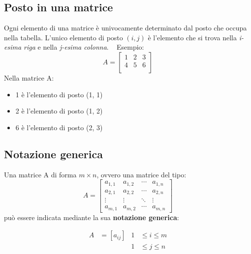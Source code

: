 \documentclass[12pt,oneside]{book}
\begin{document}
\subsection{Posto in una matrice}
Ogni elemento di una matrice è univocamente determinato dal posto che occupa nella tabella.
L'unico elemento di posto $(i,j)$ è l'elemento che si trova nella \emph{i-esima riga} e nella
\emph{j-esima colonna}. \newline
~\newline
Esempio:
\begin{equation*}
    A =
    \begin{bmatrix}
        1 & 2 & 3 \\
        4 & 5 & 6 \\
    \end{bmatrix}
\end{equation*}
Nella matrice A:
\begin{itemize}
    \item 1 è l'elemento di posto (1, 1)
    \item 2 è l'elemento di posto (1, 2)
    \item 6 è l'elemento di posto (2, 3)
\end{itemize}

\subsection{Notazione generica}
Una matrice A di forma $m \times n$, ovvero una matrice del tipo:
\begin{equation*}
    A =
    \begin{bmatrix}
        a_{1,1} & a_{1,2} & \cdots & a_{1,n} \\
        a_{2,1} & a_{2,2} & \cdots & a_{2,n} \\
        \vdots  & \vdots  & \ddots & \vdots  \\
        a_{m,1} & a_{m,2} & \cdots & a_{m,n}
    \end{bmatrix}
\end{equation*}
può essere indicata mediante la sua \textbf{notazione generica}:

\begin{align*}
    A & =[a_{ij}] & 1 & \le i \le m \\
      &           & 1 & \le j \le n
\end{align*}

\newpage
\end{document}
